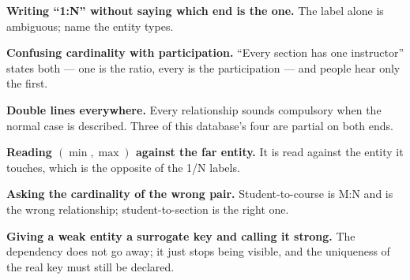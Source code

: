 \begin{pitfall}
\begin{tight}
  \item \textbf{Writing ``1:N'' without saying which end is the one.} The
        label alone is ambiguous; name the entity types.
  \item \textbf{Confusing cardinality with participation.} ``Every section has
        one instructor'' states both --- one is the ratio, every is the
        participation --- and people hear only the first.
  \item \textbf{Double lines everywhere.} Every relationship sounds compulsory
        when the normal case is described. Three of this database's four are
        partial on both ends.
  \item \textbf{Reading $(\min,\max)$ against the far entity.} It is read
        against the entity it touches, which is the opposite of the 1/N labels.
  \item \textbf{Asking the cardinality of the wrong pair.} Student-to-course is
        M:N and is the wrong relationship; student-to-section is the right one.
  \item \textbf{Giving a weak entity a surrogate key and calling it strong.}
        The dependency does not go away; it just stops being visible, and the
        uniqueness of the real key must still be declared.
\end{tight}
\end{pitfall}

